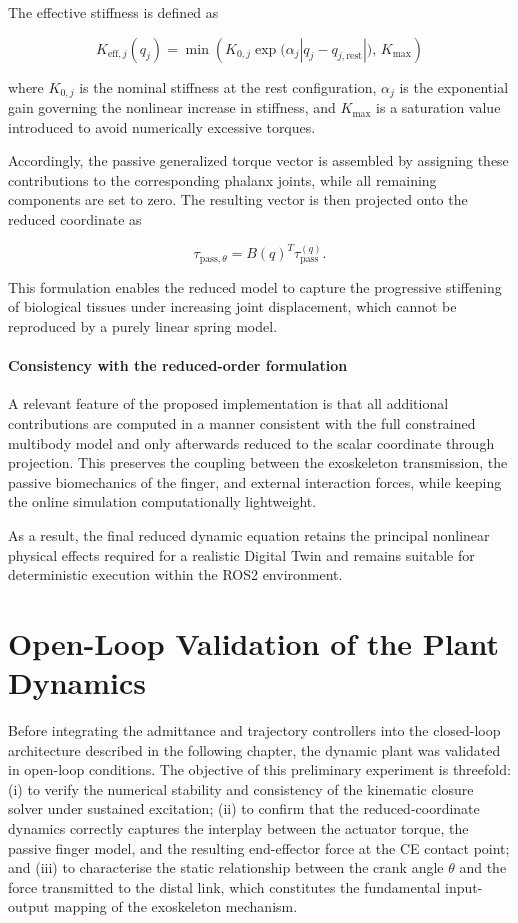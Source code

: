 The effective stiffness is defined as

\begin{equation}
K_{\mathrm{eff},j}(q_j)
=
\min\!\left(
K_{0,j}\exp\!\big(\alpha_j |q_j-q_{j,\mathrm{rest}}|\big),
\,K_{\max}
\right)
\end{equation}

where $ K_{0,j} $ is the nominal stiffness at the rest configuration, $ \alpha_j $ is the exponential gain governing the nonlinear increase in stiffness, and $ K_{\max} $ is a saturation value introduced to avoid numerically excessive torques.

Accordingly, the passive generalized torque vector is assembled by assigning these contributions to the corresponding phalanx joints, while all remaining components are set to zero. The resulting vector is then projected onto the reduced coordinate as

\begin{equation}
    \tau_{\mathrm{pass},\theta} = B(q)^T \tau_{\mathrm{pass}}^{(q)}.
\end{equation}

This formulation enables the reduced model to capture the progressive stiffening of biological tissues under increasing joint displacement, which cannot be reproduced by a purely linear spring model.

\paragraph{Consistency with the reduced-order formulation}
A relevant feature of the proposed implementation is that all additional contributions are computed in a manner consistent with the full constrained multibody model and only afterwards reduced to the scalar coordinate through projection. This preserves the coupling between the exoskeleton transmission, the passive biomechanics of the finger, and external interaction forces, while keeping the online simulation computationally lightweight.

As a result, the final reduced dynamic equation retains the principal nonlinear physical effects required for a realistic Digital Twin and remains suitable for deterministic execution within the ROS2 environment.


\section{Open-Loop Validation of the Plant Dynamics}
Before integrating the admittance and trajectory controllers into the closed-loop architecture described in the following chapter, the dynamic plant was validated in open-loop conditions. The objective of this preliminary experiment is threefold: (i) to verify the numerical stability and consistency of the kinematic closure solver under sustained excitation; (ii) to confirm that the reduced-coordinate dynamics correctly captures the interplay between the actuator torque, the passive finger model, and the resulting end-effector force at the CE contact point; and (iii) to characterise the static relationship between the crank angle $\theta$ and the force transmitted to the distal link, which constitutes the fundamental input-output mapping of the exoskeleton mechanism.


